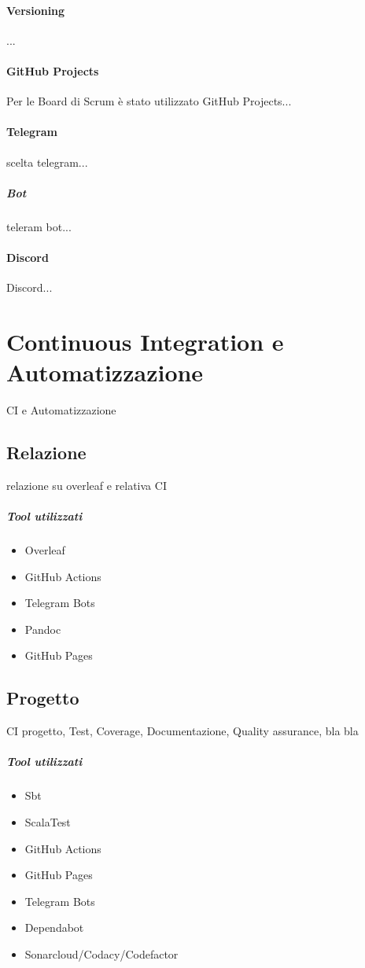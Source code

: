     \paragraph{Versioning}
    ...
    
    \paragraph{GitHub Projects }
    Per le Board di Scrum è stato utilizzato GitHub Projects...
    
    \paragraph{Telegram}
    scelta telegram...
        \subparagraph{Bot} 
        teleram bot...
    
    \paragraph{Discord}
    Discord... 

\section{Continuous Integration e Automatizzazione}
\label{chap:CI}
CI e Automatizzazione
    \subsection{Relazione}
        relazione su overleaf e relativa CI
        
        \subparagraph{Tool utilizzati}
        \begin{itemize}
            \item Overleaf
            \item GitHub Actions
            \item Telegram Bots
            \item Pandoc
            \item GitHub Pages
        \end{itemize}

    \subsection{Progetto}
        CI progetto, Test, Coverage, Documentazione, Quality assurance, bla bla
        
        \subparagraph{Tool utilizzati}
        \begin{itemize}
            \item Sbt
            \item ScalaTest
            \item GitHub Actions
            \item GitHub Pages
            \item Telegram Bots
            \item Dependabot
            \item Sonarcloud/Codacy/Codefactor
        \end{itemize}








